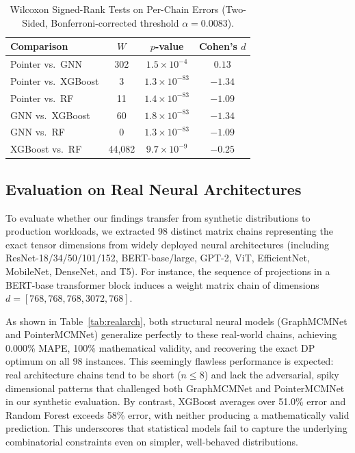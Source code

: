 \documentclass[conference]{IEEEtran}
\begin{document}
\begin{table}[htbp]
\caption{Wilcoxon Signed-Rank Tests on Per-Chain Errors (Two-Sided,
Bonferroni-corrected threshold $\alpha=0.0083$).}
\label{tab:wilcoxon}
\centering
\setlength{\tabcolsep}{4pt}
\begin{tabular}{@{}lccc@{}}
\toprule
Comparison & $W$ & $p$-value & Cohen's $d$ \\
\midrule
Pointer vs.\ GNN     & 302      & $1.5{\times}10^{-4}$  & $0.13$ \\
Pointer vs.\ XGBoost & 3        & $1.3{\times}10^{-83}$ & $-1.34$ \\
Pointer vs.\ RF      & 11       & $1.4{\times}10^{-83}$ & $-1.09$ \\
GNN vs.\ XGBoost     & 60       & $1.8{\times}10^{-83}$ & $-1.34$ \\
GNN vs.\ RF          & 0        & $1.3{\times}10^{-83}$ & $-1.09$ \\
XGBoost vs.\ RF      & 44{,}082 & $9.7{\times}10^{-9}$  & $-0.25$ \\
\bottomrule
\end{tabular}
\end{table}


\subsection{Evaluation on Real Neural Architectures}
\label{sec:realarch}

To evaluate whether our findings transfer from synthetic distributions to production workloads, we extracted 98 distinct matrix chains representing the exact tensor dimensions from widely deployed neural architectures (including ResNet-18/34/50/101/152, BERT-base/large, GPT-2, ViT, EfficientNet, MobileNet, DenseNet, and T5). For instance, the sequence of projections in a BERT-base transformer block induces a weight matrix chain of dimensions $d{=}[768, 768, 768, 3072, 768]$.

As shown in Table~\ref{tab:realarch}, both structural neural models (GraphMCMNet and PointerMCMNet) generalize perfectly to these real-world chains, achieving 0.000\% MAPE, 100\% mathematical validity, and recovering the exact DP optimum on all 98 instances. This seemingly flawless performance is expected: real architecture chains tend to be short ($n \le 8$) and lack the adversarial, spiky dimensional patterns that challenged both GraphMCMNet and PointerMCMNet in our synthetic evaluation. By contrast, XGBoost averages over 51.0\% error and Random Forest exceeds 58\% error, with neither producing a mathematically valid prediction. This underscores that statistical models fail to capture the underlying combinatorial constraints even on simpler, well-behaved distributions.
\end{document}
